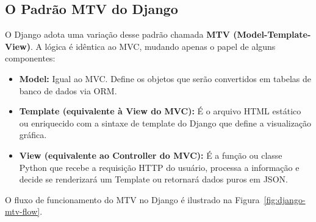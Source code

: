 \documentclass[12pt,a4paper]{article}
\begin{document}
\subsection{O Padrão MTV do Django}

O Django adota uma variação desse padrão chamada \textbf{MTV (Model-Template-View)}. A lógica é idêntica ao MVC, mudando apenas o papel de alguns componentes:
\begin{itemize}
    \item \textbf{Model:} Igual ao MVC. Define os objetos que serão convertidos em tabelas de banco de dados via ORM.
    \item \textbf{Template (equivalente à View do MVC):} É o arquivo HTML estático ou enriquecido com a sintaxe de template do Django que define a visualização gráfica.
    \item \textbf{View (equivalente ao Controller do MVC):} É a função ou classe Python que recebe a requisição HTTP do usuário, processa a informação e decide se renderizará um Template ou retornará dados puros em JSON.
\end{itemize}

O fluxo de funcionamento do MTV no Django é ilustrado na Figura~\ref{fig:django-mtv-flow}.
\end{document}
